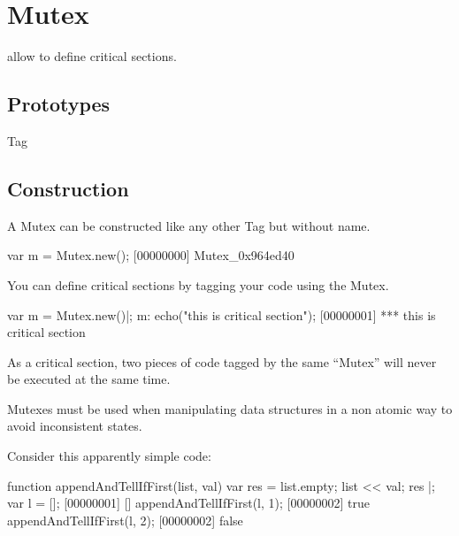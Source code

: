 
\section{Mutex}

 allow to define critical sections.

\subsection{Prototypes}
\begin{refObjects}
\item[Tag]
\end{refObjects}

\subsection{Construction}
A Mutex can be constructed like any other Tag but without name.

\begin{urbiscript}[firstnumber=1]
var m = Mutex.new();
[00000000] Mutex_0x964ed40
\end{urbiscript}

You can define critical sections by tagging your code using the Mutex.

\begin{urbiscript}[firstnumber=1]
var m = Mutex.new()|;
m: echo("this is critical section");
[00000001] *** this is critical section
\end{urbiscript}

As a critical section, two pieces of code tagged by the same ``Mutex''
will never be executed at the same time.

Mutexes must be used when manipulating data structures in a non atomic way to
avoid inconsistent states.

Consider this apparently simple code:

\begin{urbiscript}[firstnumber=1]
function appendAndTellIfFirst(list, val)
{
  var res = list.empty;
  list << val;
  res
}|;
var l = [];
[00000001] []
appendAndTellIfFirst(l, 1);
[00000002] true
appendAndTellIfFirst(l, 2);
[00000002] false
\end{urbiscript}

